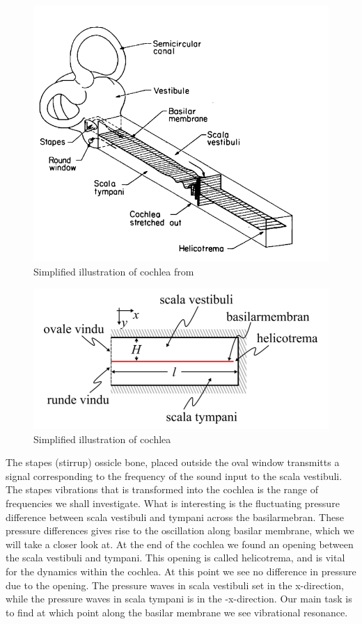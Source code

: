 \documentclass[twoside,twocolumn]{article}
\begin{document}
\begin{figure}[ht]
\centerline{\includegraphics[scale= 0.60]{Pictures/cochlea.png}}
\caption{Simplified illustration of cochlea from \cite{Zweig1976}}
\end{figure}

\begin{figure}[ht]
\centerline{\includegraphics[scale= 0.75]{IllustrationCochlea.png}}
\caption{Simplified illustration of cochlea}
\end{figure}


The stapes (stirrup) ossicle bone, placed outside the oval window transmitts a signal corresponding to the frequency of the sound input to the scala vestibuli. The stapes vibrations that is transformed into the cochlea is the range of frequencies we shall investigate. What is interesting is the fluctuating pressure difference between scala vestibuli and tympani across the basilarmebran. These pressure differences gives rise to the oscillation along basilar membrane, which we will take a closer look at. At the end of the cochlea we found an opening between the scala vestibuli and tympani. This opening is called helicotrema, and is vital for the dynamics within the cochlea. At this point we see no difference in pressure due to the opening. The pressure waves in scala vestibuli set in the x-direction, while the pressure waves in scala tympani is in the -x-direction. Our main task is to find at which point along the basilar membrane we see vibrational resonance. 
\end{document}
